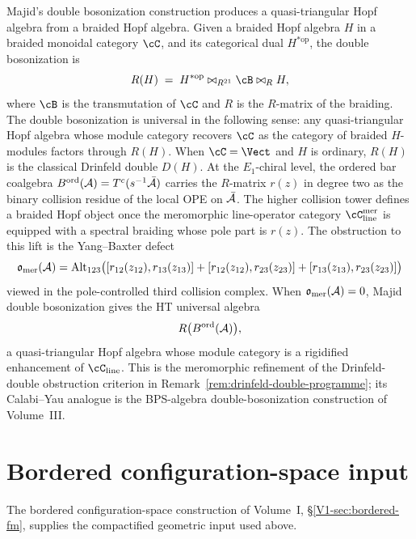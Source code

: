 \begin{remark}
\label{rem:dimofte-double-bosonization}
Majid's double bosonization construction \cite{Majid95} produces a quasi-triangular Hopf algebra from a braided Hopf algebra. Given a braided Hopf algebra $H$ in a braided monoidal category $\cC$, and its categorical dual $H^{*\mathrm{op}}$, the double bosonization is
\begin{equation}
\label{eq:double-bosonization}
R(H) \;=\; H^{*\mathrm{op}} \bowtie_{R^{21}} \cB \bowtie_R H,
\end{equation}
where $\cB$ is the transmutation of $\cC$ and $R$ is the $R$-matrix of the braiding. The double bosonization is universal in the following sense: any quasi-triangular Hopf algebra whose module category recovers $\cC$ as the category of braided $H$-modules factors through $R(H)$. When $\cC = \Vect$ and $H$ is ordinary, $R(H)$ is the classical Drinfeld double $D(H)$.
At the $E_1$-chiral level, the ordered bar coalgebra
$B^{\mathrm{ord}}(\mathcal{A})=T^c(s^{-1}\bar{\mathcal{A}})$ carries the $R$-matrix
$r(z)$ in degree two as the binary collision residue of the local OPE
on $\bar{\mathcal{A}}$. The higher collision tower defines a braided Hopf object
once the meromorphic line-operator category
$\cC_{\mathrm{line}}^{\mathrm{mer}}$ is equipped with a spectral
braiding whose pole part is $r(z)$. The obstruction to this lift is the
Yang--Baxter defect
\[
 \mathfrak{o}_{\mathrm{mer}}(\mathcal{A})
 =
 \operatorname{Alt}_{123}
 \bigl([r_{12}(z_{12}),r_{13}(z_{13})]
      +[r_{12}(z_{12}),r_{23}(z_{23})]
      +[r_{13}(z_{13}),r_{23}(z_{23})]\bigr)
\]
viewed in the pole-controlled third collision complex. When
\(\mathfrak{o}_{\mathrm{mer}}(\mathcal{A})=0\), Majid double bosonization gives
the HT universal algebra
\[
 R\bigl(B^{\mathrm{ord}}(\mathcal{A})\bigr),
\]
a quasi-triangular Hopf algebra whose module category is a rigidified
enhancement of \(\cC_{\mathrm{line}}\). This is the meromorphic
refinement of the Drinfeld-double obstruction criterion in
Remark~\ref{rem:drinfeld-double-programme}; its Calabi--Yau analogue is
the BPS-algebra double-bosonization construction of Volume~III.
\end{remark}

\section{Bordered configuration-space input}
\label{sec:integration}

The bordered configuration-space construction of Volume~I,
\S\ref*{V1-sec:bordered-fm}, supplies the compactified geometric input
used above.

